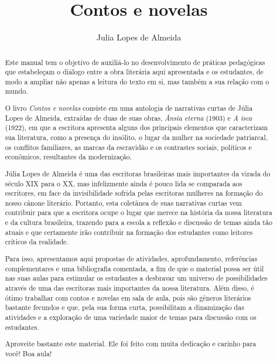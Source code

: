 \documentclass[12pt]{extarticle}
\begin{document}
\newcommand{\AutorLivro}{Julia Lopes de Almeida}
\newcommand{\TituloLivro}{Contos e novelas}
\newcommand{\Tema}{Ficção, mistério e fantasia}
\newcommand{\Genero}{Conto e novela}
\newcommand{\imagemCapa}{./images/PNLD0002-01.png}
\newcommand{\issnppub}{---}
\newcommand{\issnepub}{---}
\newcommand{\colaborador}{Rodrigo Jorge Ribeiro Neves}


\title{\TituloLivro}
\author{\AutorLivro}
\def\authornotes{\colaborador}

\date{}
\maketitle



\begin{abstract}
Este manual tem o objetivo de auxiliá-lo no desenvolvimento de práticas
pedagógicas que estabeleçam o diálogo entre a obra literária aqui
apresentada e os estudantes, de modo a ampliar não apenas a leitura do
texto em si, mas também a sua relação com o mundo.

O livro \emph{Contos e novelas} consiste em uma antologia de narrativas
curtas de Júlia Lopes de Almeida, extraídas de duas de suas obras,
\emph{Ânsia eterna} (1903) e \emph{A isca} (1922), em que a escritora
apresenta alguns dos principais elementos que caracterizam sua
literatura, como a presença do insólito, o lugar da mulher na sociedade
patriarcal, os conflitos familiares, as marcas da escravidão e os
contrastes sociais, políticos e econômicos, resultantes da modernização.

Júlia Lopes de Almeida é uma das escritoras brasileiras mais importantes
da virada do século XIX para o XX, mas infelizmente ainda é pouco lida
se comparada aos escritores, em face da invisibilidade sofrida pelas
escritoras mulheres na formação do nosso cânone literário. Portanto,
esta coletânea de suas narrativas curtas vem contribuir para que a
escritora ocupe o lugar que merece na história da nossa literatura e da
cultura brasileira, trazendo para a escola a reflexão e discussão de
temas ainda tão atuais e que certamente irão contribuir na formação dos
estudantes como leitores críticos da realidade.

Para isso, apresentamos aqui propostas de atividades, aprofundamento,
referências complementares e uma bibliografia comentada, a fim de que o
material possa ser útil nas suas aulas para estimular os estudantes a
desbravar um universo de possibilidades através de uma das escritoras
mais importantes da nossa literatura. Além disso, é ótimo trabalhar com
contos e novelas em sala de aula, pois são gêneros literários bastante
fecundos e que, pela sua forma curta, possibilitam a dinamização das
atividades e a exploração de uma variedade maior de temas para discussão
com os estudantes.

Aproveite bastante este material. Ele foi feito com muita dedicação e
carinho para você! Boa aula!
\end{abstract}
\end{document}
